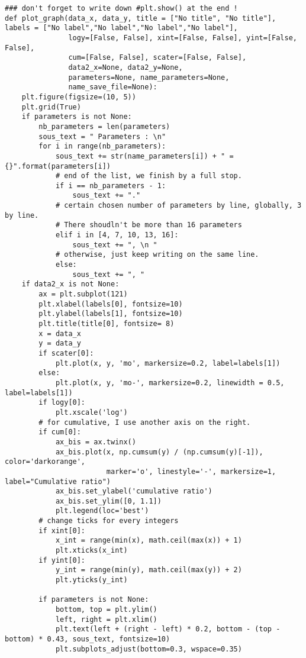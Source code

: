 \begin{Verbatim}[fontsize=\tiny]
### don't forget to write down #plt.show() at the end !
def plot_graph(data_x, data_y, title = ["No title", "No title"], labels = ["No label","No label","No label","No label"],
               logy=[False, False], xint=[False, False], yint=[False, False],
               cum=[False, False], scater=[False, False],
               data2_x=None, data2_y=None,
               parameters=None, name_parameters=None,
               name_save_file=None):
    plt.figure(figsize=(10, 5))
    plt.grid(True)
    if parameters is not None:
        nb_parameters = len(parameters)
        sous_text = " Parameters : \n"
        for i in range(nb_parameters):
            sous_text += str(name_parameters[i]) + " = {}".format(parameters[i])
            # end of the list, we finish by a full stop.
            if i == nb_parameters - 1:
                sous_text += "."
            # certain chosen number of parameters by line, globally, 3 by line.
            # There shoudln't be more than 16 parameters
            elif i in [4, 7, 10, 13, 16]:
                sous_text += ", \n "
            # otherwise, just keep writing on the same line.
            else:
                sous_text += ", "
    if data2_x is not None:
        ax = plt.subplot(121)
        plt.xlabel(labels[0], fontsize=10)
        plt.ylabel(labels[1], fontsize=10)
        plt.title(title[0], fontsize= 8)
        x = data_x
        y = data_y
        if scater[0]:
            plt.plot(x, y, 'mo', markersize=0.2, label=labels[1])
        else:
            plt.plot(x, y, 'mo-', markersize=0.2, linewidth = 0.5, label=labels[1])
        if logy[0]:
            plt.xscale('log')
        # for cumulative, I use another axis on the right.
        if cum[0]:
            ax_bis = ax.twinx()
            ax_bis.plot(x, np.cumsum(y) / (np.cumsum(y)[-1]), color='darkorange',
                        marker='o', linestyle='-', markersize=1, label="Cumulative ratio")
            ax_bis.set_ylabel('cumulative ratio')
            ax_bis.set_ylim([0, 1.1])
            plt.legend(loc='best')
        # change ticks for every integers
        if xint[0]:
            x_int = range(min(x), math.ceil(max(x)) + 1)
            plt.xticks(x_int)
        if yint[0]:
            y_int = range(min(y), math.ceil(max(y)) + 2)
            plt.yticks(y_int)

        if parameters is not None:
            bottom, top = plt.ylim()
            left, right = plt.xlim()
            plt.text(left + (right - left) * 0.2, bottom - (top - bottom) * 0.43, sous_text, fontsize=10)
            plt.subplots_adjust(bottom=0.3, wspace=0.35)


\end{Verbatim}
